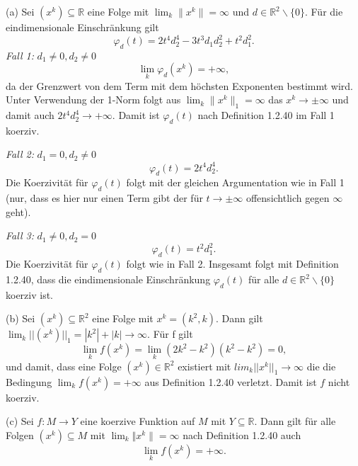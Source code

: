 \documentclass[ngerman, a4paper,12pt]{article}
\begin{document}
(a) Sei $(x^k) \subseteq \mathbb{R}$ eine Folge mit $\lim_k \| x^k \| = \infty$ und $d \in \mathbb{R}^2 \backslash \{0\}$. Für die eindimensionale Einschränkung gilt 
\begin{equation*}
	\varphi_d(t) = 2t^4d_2^4 - 3t^3d_1d_2^2 + t^2 d_1^2.
\end{equation*}
\textit{Fall 1:} $d_1 \neq 0, d_2 \neq 0$
\begin{equation}
	\lim\limits_{k} \varphi_d(x^k) = + \infty,
\end{equation}
da der Grenzwert von dem Term mit dem höchsten Exponenten bestimmt wird. Unter Verwendung der 1-Norm folgt aus $\lim_k \| x^k \|_1 = \infty$ das $x^k \rightarrow \pm \infty$ und damit auch $2t^4d_2^4 \rightarrow + \infty$. Damit ist $\varphi_d(t)$ nach Definition 1.2.40 im Fall 1 koerziv. \par
\textit{Fall 2:} $d_1 = 0, d_2 \neq 0$
\begin{equation}
	\varphi_d(t) = 2t^4d_2^4.
\end{equation}
Die Koerzivität für $\varphi_d(t)$ folgt mit der gleichen Argumentation wie in Fall 1 (nur, dass es hier nur einen Term gibt der für $t \rightarrow \pm \infty$ offensichtlich gegen $\infty$ geht). \par
\textit{Fall 3:} $d_1 \neq 0, d_2 = 0$
\begin{equation}
	\varphi_d(t) = t^2d_1^2.
\end{equation}
Die Koerzivität für $\varphi_d(t)$ folgt wie in Fall 2. Insgesamt folgt mit Definition 1.2.40, dass die eindimensionale Einschränkung $\varphi_d(t)$ für alle $d \in \mathbb{R}^2  \backslash \{0\}$ koerziv ist.
\par
(b) Sei $(x^k) \subseteq \mathbb{R}^2$ eine Folge mit $x^k = (k^2, k)$. Dann gilt $\lim_k ||(x^k)||_1 = |k^2|+|k| \rightarrow \infty$. Für f gilt
\begin{equation}
	\lim\limits_{k} f(x^k) = \lim\limits_{k} (2k^2-k^2)(k^2-k^2) = 0,
\end{equation}
und damit, dass eine Folge $(x^k) \in \mathbb{R}^2$ existiert mit $lim_k ||x^k||_1 \rightarrow \infty$ die die Bedingung $\lim_k f(x^k) = + \infty$ aus Definition 1.2.40 verletzt. Damit ist $f$ nicht koerziv. \par
(c) Sei $f: M \rightarrow Y$ eine koerzive Funktion auf $M$ mit $Y \subseteq \mathbb{R}$. Dann gilt für alle Folgen $(x^k) \subseteq M$ mit $\lim_{k} \Vert x^k \| = \infty$ nach Definition 1.2.40 auch
\begin{equation*}
\lim\limits_{k} f(x^k) = + \infty .
\end{equation*}
\end{document}
